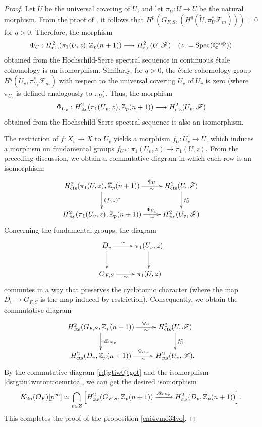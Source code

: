 \documentclass{article}
\numberwithin{equation}{section} %
\begin{document}
\begin{proof}
Let $\widetilde{U}$ be the universal covering of $U$, and let $\pi_{U}: \widetilde{U} \to U$ be the natural morphism. From the proof of \cite[Proposition 2.9]{Milne2}, it follows that $H^p(G_{F,S},(H^q(\widetilde{U},\pi_U^*\mathscr{F}_{m}))) = 0$ for $q > 0$. Therefore, the morphism
\[
  \Phi_U: H^2_{\rm cts}(\pi_1(U,z),\mathbb{Z}_p(n+1)) \longrightarrow H^2_{\mathrm{cts}}(U, \mathscr{F}) \quad (z := \operatorname{Spec}(\mathbb{Q}^{\rm sep}))
\]
obtained from the Hochschild-Serre spectral sequence in continuous étale cohomology \cite[(3.3) Theorem]{Jannsen} is an isomorphism. Similarly, for $q > 0$, the étale cohomology group $H^q(\widetilde{U}_v, \pi_{U_v}^*\mathscr{F}_{m})$ with respect to the universal covering $\widetilde{U}_v$ of $U_v$ is zero (where $\pi_{U_v}$ is defined analogously to $\pi_U$). Thus, the morphism
\[
  \Phi_{U_v}: H^2_{\rm cts}(\pi_1(U_v,z),\mathbb{Z}_p(n+1)) \longrightarrow H^2_{\mathrm{cts}}(U_v, \mathscr{F})
\]
obtained from the Hochschild-Serre spectral sequence is also an isomorphism.

       The restriction of $f: X_v \to X$ to $U_v$ yields a morphism $f_U: U_v \to U$, which induces a morphism on fundamental groups $f_{U*} : \pi_1(U_v,z) \to \pi_1(U,z)$. From the preceding discussion, we obtain a commutative diagram in which each row is an isomorphism:
\[
\xymatrix{
   H^2_{\rm cts}(\pi_1(U,z),\mathbb{Z}_p(n+1)) \ar[r]^-{\Phi_U}_-{\sim} \ar[d]^-{(f_{U*})^*} & H^2_{\mathrm{cts}}(U,\mathscr{F}) \ar[d]^-{f^*_U} \\
   H^2_{\rm cts}(\pi_1(U_v,z),\mathbb{Z}_p(n+1)) \ar[r]^-{\Phi_{U_v}}_-{\sim} & H^2_{\mathrm{cts}}(U_v,\mathscr{F}) 
  }
\]
Concerning the fundamental groups, the diagram
\[
  \xymatrix{
      D_v \ar[d]\ar[r]^-{\sim} & \pi_1(U_v,z) \ar[d] \\
      G_{F,S} \ar[r]_-{\sim} & \pi_1(U,z) 
  }
\]
commutes in a way that preserves the cyclotomic character (where the map $D_v \to G_{F,S}$ is the map induced by restriction). Consequently, we obtain the commutative diagram
\begin{equation}
\label{rdjgtiw0jtgot}
\vcenter{
\xymatrix{
   H^2_{\rm cts}(G_{F,S},\mathbb{Z}_p(n+1)) \ar[r]^-{\Phi_U}_-{\sim} \ar[d]^-{\mathscr{R}es_v} & H^2_{\mathrm{cts}}(U,\mathscr{F}) \ar[d]^-{f^*_U} \\
   H^2_{\rm cts}(D_v,\mathbb{Z}_p(n+1)) \ar[r]^-{\Phi_{U_v}}_-{\sim} & H^2_{\mathrm{cts}}(U_v,\mathscr{F}).
  }
}
\end{equation}
By the commutative diagram \eqref{rdjgtiw0jtgot} and the isomorphism \eqref{dsrgtin4wntontioemrtoa}, we can get the desired isomorphism
\[
  K_{2n}(\mathcal{O}_F)[p^\infty] \simeq \bigcap_{v \in Z} \left[H^2_{\rm cts}(G_{F,S},\mathbb{Z}_p(n+1) ) \xrightarrow{\mathscr{R}es_v} H^2_{\rm cts}(D_v,\mathbb{Z}_p(n+1)) \right].
\]
This completes the proof of the proposition \ref{eni4vmo34vo}.

\end{proof}
\end{document}
